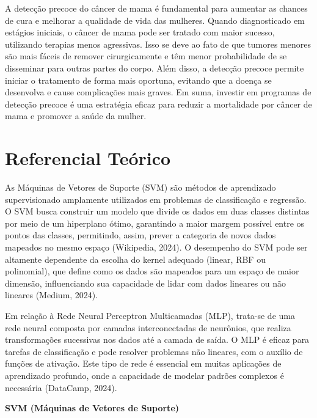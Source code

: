 \documentclass[12pt,a4paper,oneside,openany]{article}
\begin{document}
\noindent A detecção precoce do câncer de mama é fundamental para aumentar as chances de cura e melhorar a qualidade de vida das mulheres. Quando diagnosticado em estágios iniciais, o câncer de mama pode ser tratado com maior sucesso, utilizando terapias menos agressivas. Isso se deve ao fato de que tumores menores são mais fáceis de remover cirurgicamente e têm menor probabilidade de se disseminar para outras partes do corpo. Além disso, a detecção precoce permite iniciar o tratamento de forma mais oportuna, evitando que a doença se desenvolva e cause complicações mais graves. Em suma, investir em programas de detecção precoce é uma estratégia eficaz para reduzir a mortalidade por câncer de mama e promover a saúde da mulher.

\section{Referencial Teórico}

As Máquinas de Vetores de Suporte (SVM) são métodos de aprendizado supervisionado amplamente utilizados em problemas de classificação e regressão. O SVM busca construir um modelo que divide os dados em duas classes distintas por meio de um hiperplano ótimo, garantindo a maior margem possível entre os pontos das classes, permitindo, assim, prever a categoria de novos dados mapeados no mesmo espaço (Wikipedia, 2024). O desempenho do SVM pode ser altamente dependente da escolha do kernel adequado (linear, RBF ou polinomial), que define como os dados são mapeados para um espaço de maior dimensão, influenciando sua capacidade de lidar com dados lineares ou não lineares (Medium, 2024).

\noindent Em relação à Rede Neural Perceptron Multicamadas (MLP), trata-se de uma rede neural composta por camadas interconectadas de neurônios, que realiza transformações sucessivas nos dados até a camada de saída. O MLP é eficaz para tarefas de classificação e pode resolver problemas não lineares, com o auxílio de funções de ativação. Este tipo de rede é essencial em muitas aplicações de aprendizado profundo, onde a capacidade de modelar padrões complexos é necessária (DataCamp, 2024).

\noindent \textbf{SVM (Máquinas de Vetores de Suporte)}
\end{document}
